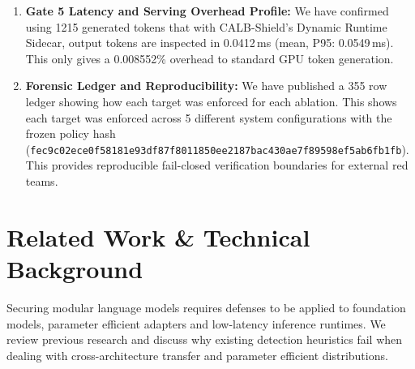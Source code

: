 \documentclass[conference]{IEEEtran}
\begin{document}
\begin{enumerate}
    \item \textbf{Gate 5 Latency and Serving Overhead Profile:} We have confirmed using 1215 generated tokens that with CALB-Shield's Dynamic Runtime Sidecar, output tokens are inspected in 0.0412\,ms (mean, P95: 0.0549\,ms). This only gives a 0.008552\% overhead to standard GPU token generation.
    \item \textbf{Forensic Ledger and Reproducibility:} We have published a 355 row ledger showing how each target was enforced for each ablation. This shows each target was enforced across 5 different system configurations with the frozen policy hash (\nolinkurl{fec9c02ece0f58181e93df87f8011850ee2187bac430ae7f89598ef5ab6fb1fb}). This provides reproducible fail-closed verification boundaries for external red teams.
\end{enumerate}

\section{Related Work \& Technical Background}
\label{sec:related_work}

Securing modular language models requires defenses to be applied to foundation models, parameter efficient adapters and low-latency inference runtimes. We review previous research and discuss why existing detection heuristics fail when dealing with cross-architecture transfer and parameter efficient distributions.
\end{document}
